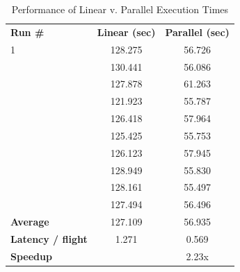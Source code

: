     
    \begin{table}[tb]
    	\centering
        \caption{\small{Performance of Linear v. Parallel Execution Times}} \label{tab:performance_results}
        \vspace{3pt}
        \begin{tabular}{@{} >{\centering\arraybackslash} m{.23\linewidth} S[table-format=3.3] S[table-format=2.3] @{}}
            \hline\noalign{\smallskip}
            \bfseries Run \# & \bfseries Linear (sec) & \bfseries Parallel (sec) \\
            \noalign{\smallskip}
            \hline
            \noalign{\smallskip}
             1 & 128.275 & 56.726 \\  & 130.441 & 56.086 \\  & 127.878 & 61.263 \\  & 121.923 & 55.787 \\  & 126.418 & 57.964 \\  & 125.425 & 55.753 \\  & 126.123 & 57.945 \\  & 128.949 & 55.830 \\  & 128.161 & 55.497 \\  & 127.494 & 56.496 \\ \hline
            \hline
            \bfseries Average           & 127.109 & 56.935 \\ \hline
            \bfseries Latency / flight  &   1.271 &  0.569 \\ \hline
            \bfseries Speedup           &         &  2.23x \\ \hline
        \end{tabular}
    \end{table}
    
    
    
    